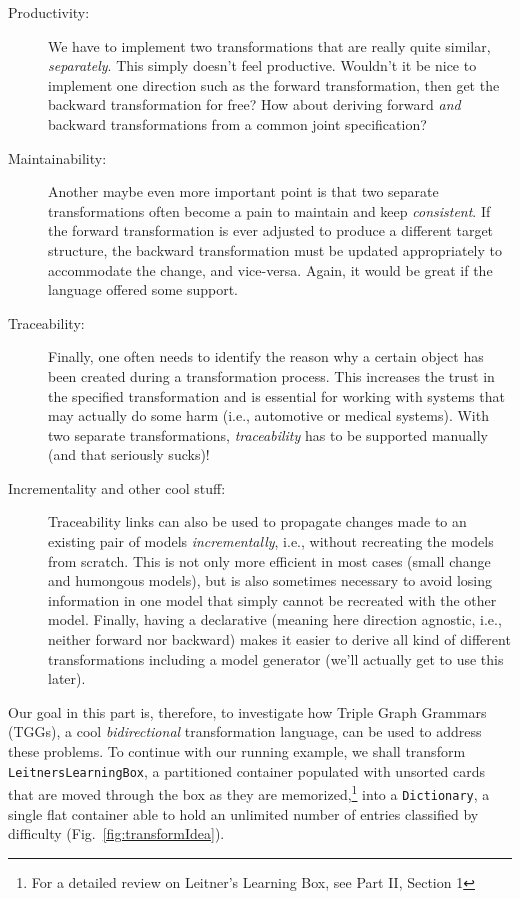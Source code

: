 \begin{description}
\item[Productivity:] We have to implement two transformations that are really quite similar, \emph{separately}. This simply doesn't feel productive.
Wouldn't it be nice to implement one direction such as the forward transformation, then get the backward transformation for free? How about deriving
forward \emph{and} backward transformations from a common joint specification?

\item[Maintainability:] Another maybe even more important point is that two separate transformations often become a pain to maintain and keep
\emph{consistent}. If the forward transformation is ever adjusted to produce a different target structure, the backward transformation must be updated
appropriately to accommodate the change, and vice-versa.  Again, it would be great if the language offered some support.

\item[Traceability:] Finally, one often needs to identify the reason why a certain object has been created during a transformation process. This increases the
trust in the specified transformation and is essential for working with systems that may actually do some harm (i.e., automotive or medical systems). With two
separate transformations, \emph{traceability} has to be supported manually (and that seriously sucks)! 

\item[Incrementality and other cool stuff:] Traceability links can also be used to propagate changes made to an existing pair of models \emph{incrementally}, i.e., without recreating the models from scratch. 
This is not only more efficient in most cases (small change and humongous models), but is also sometimes necessary to avoid losing information in one model that simply cannot be recreated with the other model.
Finally, having a declarative (meaning here direction agnostic, i.e., neither forward nor backward) makes it easier to derive all kind of different transformations including a model generator (we'll actually get to use this later).
\end{description}

Our goal in this part is, therefore, to investigate how Triple Graph Grammars (TGGs), a cool \emph{bidirectional} transformation language, can be used to address these problems. 
To continue with our running example, we shall transform \texttt{Leit\-ners\-Learn\-ing\-Box}, a partitioned container populated with unsorted cards that are moved through the box as they are memorized,\footnote{For a detailed review on Leitner's Learning Box, see Part II, Section 1} into a \texttt{Dictionary}, a single flat container able to hold an unlimited number of entries classified by difficulty (Fig.~\ref{fig:transformIdea}).

